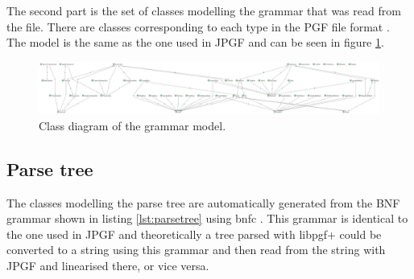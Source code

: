 The second part is the set of classes modelling the grammar that was read from the file. There are classes corresponding to each type in the PGF file format \cite{Angelov}. The model is the same as the one used in JPGF and can be seen in figure \ref{fig:grammarmodel}.

\begin{figure}[htb]
\centering
\includegraphics[width=\textheight,angle=90]{fig/grammarmodel}
\caption{Class diagram of the grammar model.}
\label{fig:grammarmodel}
\end{figure}


\subsection{Parse tree}
The classes modelling the parse tree are automatically generated from the BNF grammar shown in listing \ref{lst:parsetree} using bnfc \cite{bnfc}. This grammar is identical to the one used in JPGF and theoretically a tree parsed with libpgf+ could be converted to a string using this grammar and then read from the string with JPGF and linearised there, or vice versa.



